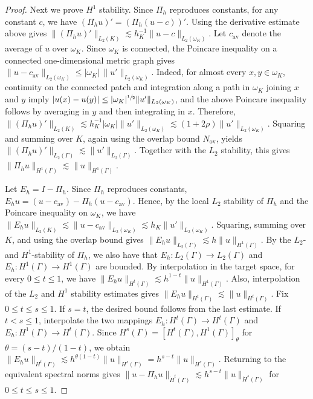 \documentclass[numbers,webpdf]{ima-authoring-template}%
\theoremstyle{thmstyletwo}%
\numberwithin{equation}{section}
\begin{document}
\begin{proof}
    Next we prove $H^1$ stability. Since $\Pi_h$ reproduces constants, for any constant $c$, we have $(\Pi_hu)'=(\Pi_h(u-c))'$. Using the derivative estimate above gives $\|(\Pi_hu)'\|_{L_2(K)}\lesssim h_K^{-1}\|u-c\|_{L_2(\omega_K)}$. Let $c_{\mathrm{av}}$ denote the average of $u$ over $\omega_K$. Since $\omega_K$ is connected, the Poincare inequality on a connected one-dimensional metric graph gives $ \|u-c_{\mathrm{av}}\|_{L_2(\omega_K)} \leq|\omega_K|\,\|u'\|_{L_2(\omega_K)}$. Indeed, for almost every $x,y\in\omega_K$, continuity on the connected patch and integration along a path in $\omega_K$ joining $x$ and $y$ imply $|u(x)-u(y)|\leq|\omega_K|^{\sfrac{1}{2}}\|u'\|_{L_2(\omega_K)}$, and the above Poincare inequality follows by averaging in $y$ and then integrating in $x$. Therefore, $\|(\Pi_hu)'\|_{L_2(K)}\lesssim h_K^{-1}|\omega_K|\|u'\|_{L_2(\omega_K)}\lesssim(1+2\rho)\|u'\|_{L_2(\omega_K)}$. Squaring and summing over $K$, again using the overlap bound $N_{\mathrm{ov}}$, yields $\|(\Pi_hu)'\|_{L_2(\Gamma)}\lesssim\|u'\|_{L_2(\Gamma)}$. Together with the $L_2$ stability, this gives $\|\Pi_hu\|_{H^1(\Gamma)}\lesssim\|u\|_{H^1(\Gamma)}$.

    Let $E_h=I-\Pi_h$. Since $\Pi_h$ reproduces constants, $E_hu=(u-c_{\mathrm{av}})-\Pi_h(u-c_{\mathrm{av}})$. Hence, by the local $L_2$ stability of $\Pi_h$ and the Poincare inequality on $\omega_K$, we have $\|E_hu\|_{L_2(K)}\lesssim \|u-c_{\mathrm{av}}\|_{L_2(\omega_K)}\lesssim h_K\|u'\|_{L_2(\omega_K)}$.  Squaring, summing over $K$, and using the overlap bound gives $\|E_hu\|_{L_2(\Gamma)}\lesssim h\|u\|_{H^1(\Gamma)}$. By the $L_2$- and $H^1$-stability of $\Pi_h$, we also have that $E_h:L_2(\Gamma)\to L_2(\Gamma)$ and $E_h: H^1(\Gamma)\to H^1(\Gamma)$ are bounded. By interpolation in the target space, for every $0\leq t\leq1$, we have $\|E_hu\|_{H^t(\Gamma)}\lesssim h^{1-t}\|u\|_{H^1(\Gamma)}$. Also, interpolation of the $L_2$ and $H^1$ stability estimates gives $\|E_hu\|_{H^t(\Gamma)}\lesssim\|u\|_{H^t(\Gamma)}$. Fix $0\leq t\leq s\leq1$. If $s=t$, the desired bound follows from the last estimate. If $t<s\leq1$, interpolate the two mappings $E_h:H^t(\Gamma)\to H^t(\Gamma)$ and $E_h:H^1(\Gamma)\to H^t(\Gamma)$. Since $H^s(\Gamma)=[H^t(\Gamma),H^1(\Gamma)]_\theta$ for $\theta=(s-t)/(1-t)$, we obtain $\|E_hu\|_{H^t(\Gamma)}\lesssim h^{\theta(1-t)}\|u\|_{H^s(\Gamma)}= h^{s-t}\|u\|_{H^s(\Gamma)}$. Returning to the equivalent spectral norms gives $\|u-\Pi_hu\|_{\dot H^t(\Gamma)}\lesssim h^{s-t}\|u\|_{\dot H^s(\Gamma)}$ for $0\leq t\leq s\leq1$.


\end{proof}
\end{document}
